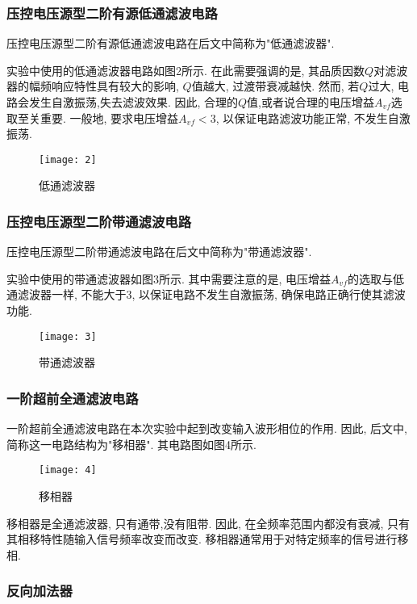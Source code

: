 \documentclass[UTF2]{ctexart}
\begin{document}
	\subsubsection{压控电压源型二阶有源低通滤波电路}
	
	压控电压源型二阶有源低通滤波电路在后文中简称为"低通滤波器".
	
	实验中使用的低通滤波器电路如图2所示. 在此需要强调的是, 其品质因数$Q$对滤波器的幅频响应特性具有较大的影响, $Q$值越大, 过渡带衰减越快. 然而, 若$Q$过大, 电路会发生自激振荡,失去滤波效果. 因此, 合理的$Q$值,或者说合理的电压增益$A_{vf}$选取至关重要. 一般地, 要求电压增益$A_{vf} < 3$, 以保证电路滤波功能正常, 不发生自激振荡.
	
	\begin{figure}[h]
		\centering
		\texttt{[image: 2]}
		\caption{低通滤波器}
	\end{figure}
	
	
	\subsubsection{压控电压源型二阶带通滤波电路}
	
	压控电压源型二阶带通滤波电路在后文中简称为"带通滤波器".
	
	实验中使用的带通滤波器如图3所示. 其中需要注意的是, 电压增益$A_{vf}$的选取与低通滤波器一样, 不能大于3, 以保证电路不发生自激振荡, 确保电路正确行使其滤波功能.
	
	\begin{figure}[h]
		\centering
		\texttt{[image: 3]}
		\caption{带通滤波器}
	\end{figure}
	
	\subsubsection{一阶超前全通滤波电路}
	一阶超前全通滤波电路在本次实验中起到改变输入波形相位的作用. 因此, 后文中, 简称这一电路结构为"移相器". 其电路图如图4所示.
	
	\begin{figure}[h]
		\centering
		\texttt{[image: 4]}
		\caption{移相器}
	\end{figure}
	
	移相器是全通滤波器, 只有通带,没有阻带. 因此, 在全频率范围内都没有衰减, 只有其相移特性随输入信号频率改变而改变. 移相器通常用于对特定频率的信号进行移相.
	
	\subsubsection{反向加法器}
	
\end{document}

